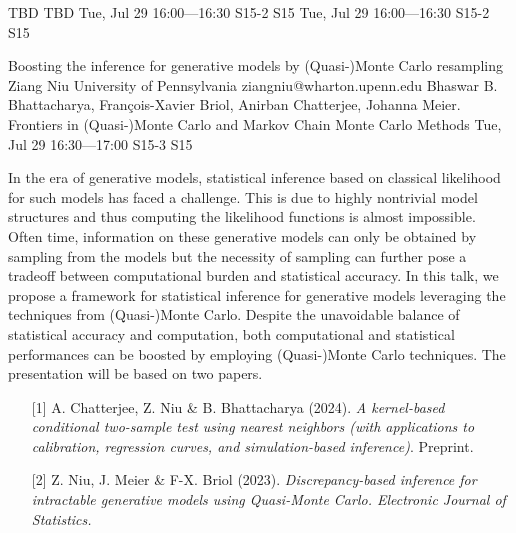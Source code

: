 \begin{talk}
  {TBD}%
  {TBD}%
  {Tue, Jul 29 16:00---16:30}%
  {S15-2}%
  {S15}%
  {}%
  {Tue, Jul 29 16:00---16:30}%
  {S15-2}%
  {S15}%
\end{talk}

\begin{talk}
  {Boosting the inference for generative models by (Quasi-)Monte Carlo resampling}%
  {Ziang Niu}%
  {University of Pennsylvania}%
  {ziangniu@wharton.upenn.edu}%
  {Bhaswar B. Bhattacharya, Fran\c{c}ois-Xavier Briol, Anirban Chatterjee, Johanna Meier.}%
  {Frontiers in (Quasi-)Monte Carlo and Markov Chain Monte Carlo Methods}%
  {Tue, Jul 29 16:30---17:00}%
  {S15-3}%
  {S15}%
    
   
In the era of generative models, statistical inference based on classical likelihood for such models has faced a challenge. This is due to highly nontrivial model structures and thus computing the likelihood functions is almost impossible. Often time, information on these generative models can only be obtained by sampling from the models but the necessity of sampling can further pose a tradeoff between computational burden and statistical accuracy. In this talk, we propose a framework for statistical inference for generative models leveraging the techniques from (Quasi-)Monte Carlo. Despite the unavoidable balance of statistical accuracy and computation, both computational and statistical performances can be boosted by employing (Quasi-)Monte Carlo techniques. The presentation will be based on two papers.

\begin{enumerate}
 \item[{[1]}] A. Chatterjee, Z. Niu \& B. Bhattacharya (2024). {\it A kernel-based conditional two-sample test using nearest neighbors (with applications to calibration, regression curves, and simulation-based inference)}. Preprint.
 \item[{[2]}] Z. Niu, J. Meier \& F-X. Briol (2023). \it{Discrepancy-based inference for
  intractable generative models using
  Quasi-Monte Carlo.} Electronic Journal of Statistics.
\end{enumerate}

\medskip

\end{talk}

